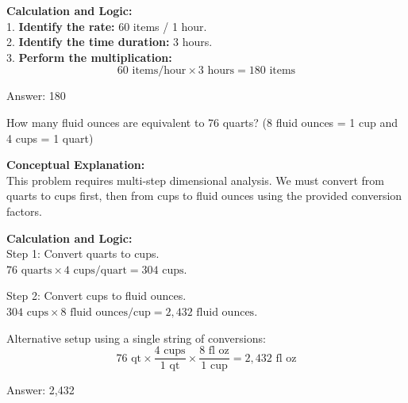 \documentclass[11pt,paper=a4,answers]{exam}
\begin{document}
\begin{questions}
\begin{solution}
\vspace{30pt}

\textbf{Calculation and Logic:} \\
1. \textbf{Identify the rate:} 60 items / 1 hour. \\
2. \textbf{Identify the time duration:} 3 hours. \\
3. \textbf{Perform the multiplication:} 
\[ 60 \text{ items/hour} \times 3 \text{ hours} = 180 \text{ items} \]

\vspace{30pt}

Answer: \colorbox{yellow!100}{180}
\end{solution}

\vspace{60pt}

\question
How many fluid ounces are equivalent to 76 quarts? (8 fluid ounces = 1 cup and 4 cups = 1 quart)

\begin{solution}
\textbf{Conceptual Explanation:} \\
This problem requires multi-step dimensional analysis. We must convert from quarts to cups first, then from cups to fluid ounces using the provided conversion factors.

\vspace{30pt}

\textbf{Calculation and Logic:} \\
Step 1: Convert quarts to cups. \\
$76 \text{ quarts} \times 4 \text{ cups/quart} = 304 \text{ cups}$.

\vspace{15pt}

Step 2: Convert cups to fluid ounces. \\
$304 \text{ cups} \times 8 \text{ fluid ounces/cup} = 2,432 \text{ fluid ounces}$.

\vspace{15pt}

Alternative setup using a single string of conversions:
\[ 76 \text{ qt} \times \frac{4 \text{ cups}}{1 \text{ qt}} \times \frac{8 \text{ fl oz}}{1 \text{ cup}} = 2,432 \text{ fl oz} \]

\vspace{30pt}

Answer: \colorbox{yellow!100}{2,432}
\end{solution}


\end{questions}
\end{document}
